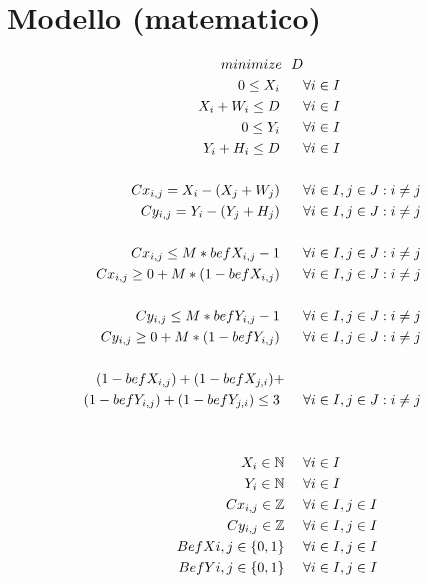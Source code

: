 


	\section{Modello (matematico)}


\begin{align*}	%
minimize \ \ D \\	%
%
0 \leq X_i           \ \ \ \ \   &\forall{ i \in I} \\
X_i +W_i \leq D      \ \ \ \ \   &\forall{ i \in I} \\
0 \leq Y_i           \ \ \ \ \   &\forall{ i \in I} \\
Y_i +H_i \leq D      \ \ \ \ \   &\forall{ i \in I} \\ \\
%
%
Cx_{i,j} = X_i - (X_j + W_j)       \ \ \ \ \   &\forall{ i \in I, j \in J: i \neq j} \\
Cy_{i,j} = Y_i - (Y_j + H_j)       \ \ \ \ \   &\forall{ i \in I, j \in J: i \neq j} \\ \\
%
%
Cx_{i,j} \leq M *befX_{i,j} -1           \ \ \ \ \   &\forall{ i \in I, j \in J: i \neq j} \\
Cx_{i,j} \geq 0 + M*(1-befX_{i,j})       \ \ \ \ \   &\forall{ i \in I, j \in J: i \neq j} \\ \\
%
%
Cy_{i,j} \leq M *befY_{i,j} -1           \ \ \ \ \   &\forall{ i \in I, j \in J: i \neq j} \\
Cy_{i,j} \geq 0 + M*(1-befY_{i,j})       \ \ \ \ \   &\forall{ i \in I, j \in J: i \neq j} \\ \\
%
%
(1-befX_{i,j})+(1-befX_{j,i})+ \ \ \ \ & \\ (1-befY_{i,j})+(1-befY_{j,i}) \leq 3       \ \ \ \ \   &\forall{ i \in I, j \in J: i \neq j} \\ \\
%
%
%
\\
X_i \in \NaturalSet      \ \ \ \ &\forall{i \in I} \\
Y_i \in \NaturalSet      \ \ \ \ &\forall{i \in I} \\
Cx_{i,j} \in \IntegerSet \ \ \ \ &\forall{i \in I,j \in I} \\
Cy_{i,j} \in \IntegerSet \ \ \ \ &\forall{i \in I,j \in I} \\
BefX{i,j} \in \BinSet    \ \ \ \ &\forall{i \in I,j \in I} \\
BefY{i,j} \in \BinSet    \ \ \ \ &\forall{i \in I,j \in I} 
%
 \end{align*}



